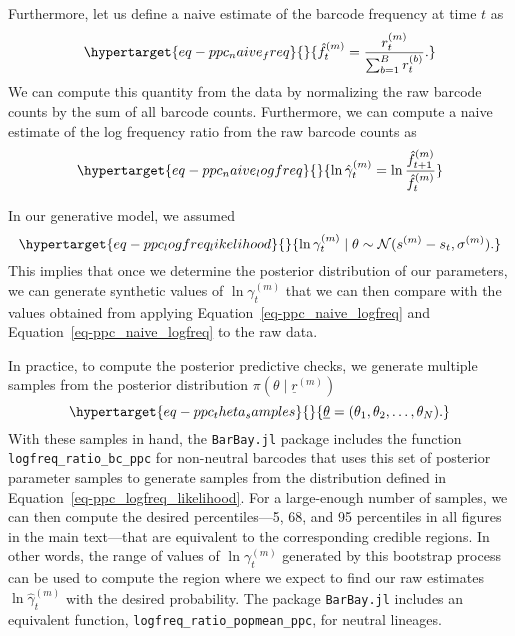 \documentclass[
  letterpaper,
  DIV=11,
  numbers=noendperiod]{scrartcl}
\begin{document}
\begin{refsegment}
Furthermore, let us define a naive estimate of the barcode frequency at
time \(t\) as \begin{equation}\protect\hypertarget{eq-ppc_naive_freq}{}{
\hat{f}_t^{(m)} = \frac{r^{(m)}_t}{\sum_{b=1}^B r^{(b)}_t}.
}\label{eq-ppc_naive_freq}\end{equation} We can compute this quantity
from the data by normalizing the raw barcode counts by the sum of all
barcode counts. Furthermore, we can compute a naive estimate of the log
frequency ratio from the raw barcode counts as
\begin{equation}\protect\hypertarget{eq-ppc_naive_logfreq}{}{
\ln \hat{\gamma}_t^{(m)} = \ln \frac{\hat{f}_{t+1}^{(m)}}{\hat{f}_t^{(m)}}
}\label{eq-ppc_naive_logfreq}\end{equation}

In our generative model, we assumed
\begin{equation}\protect\hypertarget{eq-ppc_logfreq_likelihood}{}{
\ln\gamma^{(m)}_t \mid \theta \sim \mathcal{N}(s^{(m)} - s_t, \sigma^{(m)}).
}\label{eq-ppc_logfreq_likelihood}\end{equation} This implies that once
we determine the posterior distribution of our parameters, we can
generate synthetic values of \(\ln \gamma^{(m)}_t\) that we can then
compare with the values obtained from applying
Equation~\ref{eq-ppc_naive_logfreq} and
Equation~\ref{eq-ppc_naive_logfreq} to the raw data.

In practice, to compute the posterior predictive checks, we generate
multiple samples from the posterior distribution
\(\pi(\theta \mid \underline{r}^{(m)})\)
\begin{equation}\protect\hypertarget{eq-ppc_theta_samples}{}{
\underline{\theta} = (\theta_1, \theta_2, \ldots, \theta_N).
}\label{eq-ppc_theta_samples}\end{equation} With these samples in hand,
the \texttt{BarBay.jl} package includes the function
\texttt{logfreq\_ratio\_bc\_ppc} for non-neutral barcodes that uses this
set of posterior parameter samples to generate samples from the
distribution defined in Equation~\ref{eq-ppc_logfreq_likelihood}. For a
large-enough number of samples, we can then compute the desired
percentiles---5, 68, and 95 percentiles in all figures in the main
text---that are equivalent to the corresponding credible regions. In
other words, the range of values of \(\ln\gamma_t^{(m)}\) generated by
this bootstrap process can be used to compute the region where we expect
to find our raw estimates \(\ln\hat{\gamma}_t^{(m)}\) with the desired
probability. The package \texttt{BarBay.jl} includes an equivalent
function, \texttt{logfreq\_ratio\_popmean\_ppc}, for neutral lineages.


\end{refsegment}
\end{document}
